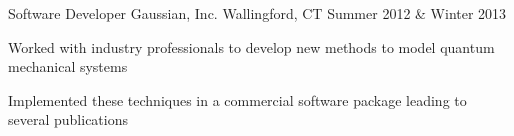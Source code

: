


\begin{cventries}




\cventry
{Software Developer} %
{Gaussian, Inc.} %
{Wallingford, CT} %
{Summer 2012 \& Winter 2013} %
{ %
\begin{cvitems}
\item {Worked with industry professionals to develop new methods to model quantum mechanical systems}
\item{Implemented these techniques in a commercial software package leading to several publications}
\end{cvitems}
}



\end{cventries}